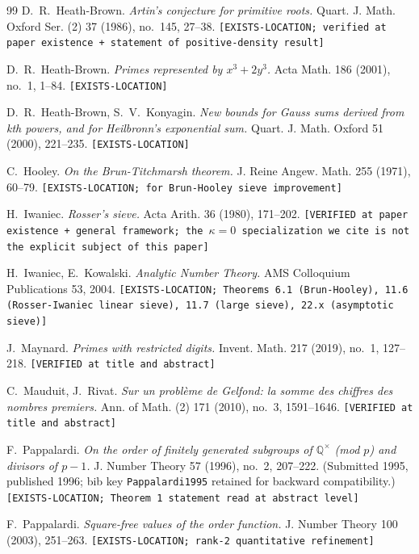 \documentclass[11pt,a4paper]{article}
\theoremstyle{plain}
\theoremstyle{definition}
\theoremstyle{remark}
\begin{document}
\begin{thebibliography}{99}
D.~R.~Heath-Brown.
\emph{Artin's conjecture for primitive roots.}
Quart. J. Math. Oxford Ser. (2) 37 (1986), no.~145, 27--38.
\texttt{[EXISTS-LOCATION; verified at paper existence + statement of
positive-density result]}

D.~R.~Heath-Brown.
\emph{Primes represented by $x^{3} + 2 y^{3}$.}
Acta Math. 186 (2001), no.~1, 1--84.
\texttt{[EXISTS-LOCATION]}

D.~R.~Heath-Brown, S.~V.~Konyagin.
\emph{New bounds for Gauss sums derived from kth powers, and for
Heilbronn's exponential sum.}
Quart. J. Math. Oxford 51 (2000), 221--235.
\texttt{[EXISTS-LOCATION]}

C.~Hooley.
\emph{On the Brun-Titchmarsh theorem.}
J. Reine Angew. Math. 255 (1971), 60--79.
\texttt{[EXISTS-LOCATION; for Brun-Hooley sieve improvement]}

H.~Iwaniec.
\emph{Rosser's sieve.}
Acta Arith. 36 (1980), 171--202.
\texttt{[VERIFIED at paper existence + general framework; the $\kappa
= 0$ specialization we cite is not the explicit subject of this
paper]}

H.~Iwaniec, E.~Kowalski.
\emph{Analytic Number Theory.}
AMS Colloquium Publications 53, 2004.
\texttt{[EXISTS-LOCATION; Theorems 6.1 (Brun-Hooley), 11.6
(Rosser-Iwaniec linear sieve), 11.7 (large sieve), 22.x (asymptotic
sieve)]}

J.~Maynard.
\emph{Primes with restricted digits.}
Invent. Math. 217 (2019), no.~1, 127--218.
\texttt{[VERIFIED at title and abstract]}

C.~Mauduit, J.~Rivat.
\emph{Sur un probl\`eme de Gelfond: la somme des chiffres des nombres
premiers.}
Ann. of Math. (2) 171 (2010), no.~3, 1591--1646.
\texttt{[VERIFIED at title and abstract]}

F.~Pappalardi.
\emph{On the order of finitely generated subgroups of
$\mathbb{Q}^{\times}$ (mod $p$) and divisors of $p - 1$.}
J. Number Theory 57 (1996), no.~2, 207--222.
(Submitted 1995, published 1996; bib key
\texttt{Pappalardi1995} retained for backward compatibility.)
\texttt{[EXISTS-LOCATION; Theorem 1 statement read at abstract level]}

F.~Pappalardi.
\emph{Square-free values of the order function.}
J. Number Theory 100 (2003), 251--263.
\texttt{[EXISTS-LOCATION; rank-2 quantitative refinement]}


\end{thebibliography}
\end{document}
